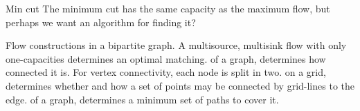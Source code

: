 \begin{algorithm}{Min cut}
\keyword{} The minimum cut has the same capacity as the maximum flow,
but perhaps we want an algorithm for finding it?
\end{algorithm}

\begin{algorithm}{Flow constructions}
 in a bipartite graph. A multisource, multisink flow
with only one-capacities determines an optimal matching.
 of a graph, determines how connected
it is. For vertex connectivity, each node is split in two.
 on a grid, determines whether and how a set of
points may be connected by grid-lines to the edge.
 of a graph, determines a minimum set of paths to
cover it.
\end{algorithm}
